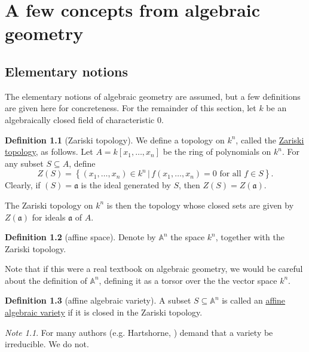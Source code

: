 \documentclass[a4paper,10pt]{scrreprt}
\newcommand{\defn}[1]{\ul{#1}}
\theoremstyle{definition}
\newtheorem{definition}{Definition}[section]
\theoremstyle{plain}
\theoremstyle{remark}
\newtheorem{note}{Note}[section]
\begin{document}
\chapter{A few concepts from algebraic geometry}
\section{Elementary notions}
The elementary notions of algebraic geometry are assumed, but a few definitions are given here for concreteness. For the remainder of this section, let $k$ be an algebraically closed field of characteristic $0$.
\begin{definition}[Zariski topology]
  \label{def:zariskitopology}
  We define a topology on $k^{n}$, called the \defn{Zariski topology}, as follows. Let $A = k[x_{1},\dots,x_{n}]$ be the ring of polynomials on $k^{n}$. For any subset $S \subseteq A$, define
  \begin{equation*}
    Z(S) = \left\{ (x_{1},\dots,x_{n}) \in k^{n}\,\Big|\, f(x_{1},\dots,x_{n}) = 0\text{ for all }f \in S \right\}.
  \end{equation*}
  Clearly, if $(S) = \mathfrak{a}$ is the ideal generated by $S$, then $Z(S) = Z(\mathfrak{a})$.

  The Zariski topology on $k^{n}$ is then the topology whose closed sets are given by $Z(\mathfrak{a})$ for ideals $\mathfrak{a}$ of $A$.
\end{definition}

\begin{definition}[affine space]
  \label{def:affinespace}
  Denote by $\mathbb{A}^{n}$ the space $k^{n}$, together with the Zariski topology. 

  Note that if this were a real textbook on algebraic geometry, we would be careful about the definition of $\mathbb{A}^{n}$, defining it as a torsor over the the vector space $k^{n}$.
\end{definition} 

\begin{definition}[affine algebraic variety]
  \label{def:algebraicvariety}
  A subset $S \subseteq \mathbb{A}^{n}$ is called an \defn{affine algebraic variety} if it is closed in the Zariski topology.
\end{definition}

\begin{note}
  For many authors (e.g. Hartshorne, \cite{hartshorne-algebraic-geometry}) demand that a variety be irreducible. We do not.
\end{note}
\end{document}
